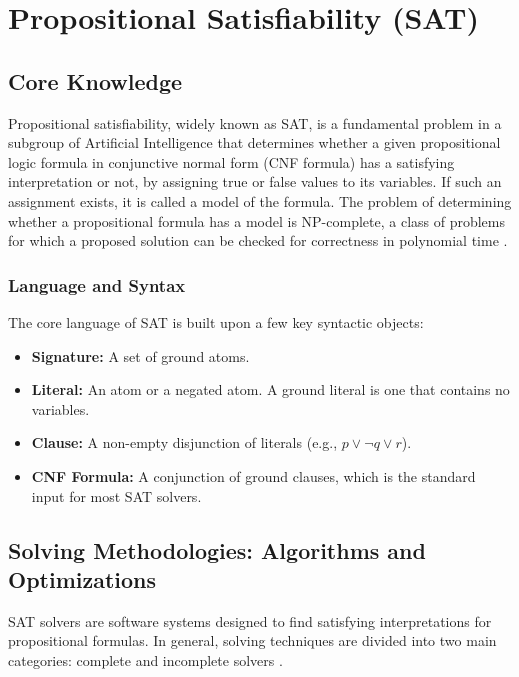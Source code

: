 \documentclass[12pt, a4paper, oneside]{report} %
\begin{document}
\section{Propositional Satisfiability (SAT)}
\subsection{Core Knowledge}
Propositional satisfiability, widely known as SAT, is a fundamental problem in a subgroup of Artificial Intelligence that determines whether a given propositional logic formula in conjunctive normal form (CNF formula) has a satisfying interpretation or not, by assigning true or false values to its variables. If such an assignment exists, it is called a model of the formula. The problem of determining whether a propositional formula has a model is NP-complete, a class of problems for which a proposed solution can be checked for correctness in polynomial time \cite{Cook1971}.
\subsubsection{Language and Syntax}
The core language of SAT is built upon a few key syntactic objects:
\begin{itemize}
    \item \textbf{Signature:} A set of ground atoms.
    \item \textbf{Literal:} An atom or a negated atom. A ground literal is one that contains no variables.
    \item \textbf{Clause:} A non-empty disjunction of literals (e.g., $p \lor \neg q \lor r$).
    \item \textbf{CNF Formula:} A conjunction of ground clauses, which is the standard input for most SAT solvers.
\end{itemize}

\subsection{Solving Methodologies: Algorithms and Optimizations}
SAT solvers are software systems designed to find satisfying interpretations for propositional formulas. In general, solving techniques are divided into two main categories: complete and incomplete solvers \cite{HandbookSAT2009}.
\end{document}
